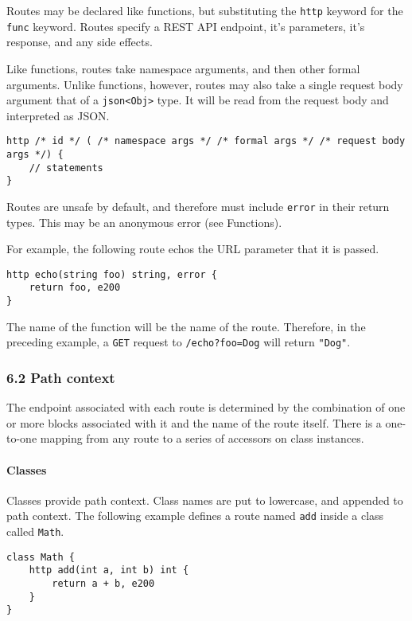 Routes may be declared like functions, but substituting the
\texttt{http} keyword for the \texttt{func} keyword. Routes specify a
REST API endpoint, it's parameters, it's response, and any side effects.

Like functions, routes take namespace arguments, and then other formal
arguments. Unlike functions, however, routes may also take a single
request body argument that of a
\texttt{json\textless{}Obj\textgreater{}} type. It will be read from the
request body and interpreted as JSON.

\begin{verbatim}
http /* id */ ( /* namespace args */ /* formal args */ /* request body args */) {
    // statements
}
\end{verbatim}

Routes are unsafe by default, and therefore must include \texttt{error}
in their return types. This may be an anonymous error (see Functions).

For example, the following route echos the URL parameter that it is
passed.

\begin{verbatim}
http echo(string foo) string, error {
    return foo, e200
}
\end{verbatim}

The name of the function will be the name of the route. Therefore, in
the preceding example, a \texttt{GET} request to \texttt{/echo?foo=Dog}
will return \texttt{"Dog"}.

\subsubsection{6.2 Path context}\label{path-context}

The endpoint associated with each route is determined by the combination
of one or more blocks associated with it and the name of the route
itself. There is a one-to-one mapping from any route to a series of
accessors on class instances.

\paragraph{Classes}\label{classes-1}

Classes provide path context. Class names are put to lowercase, and
appended to path context. The following example defines a route named
\texttt{add} inside a class called \texttt{Math}.

\begin{verbatim}
class Math {
    http add(int a, int b) int {
        return a + b, e200
    }
}
\end{verbatim}

